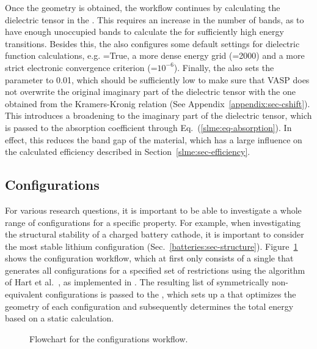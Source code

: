 \begin{refsection}
Once the geometry is obtained, the workflow continues by calculating the 
dielectric tensor in the . This requires an increase in the 
number of bands, as to have enough unoccupied bands to calculate the 
 for sufficiently high energy 
transitions. Besides this, the  also configures some default 
settings for dielectric function calculations, e.g. =True, a 
more dense energy grid (=2000) and a more strict electronic 
convergence criterion (=$10^{-6}$). Finally, the  
also sets the  parameter to 0.01, which should be sufficiently low to make sure 
that VASP does not overwrite the original imaginary part of the 
dielectric tensor with the one obtained from the Kramers-Kronig relation (See Appendix~\ref{appendix:sec-cshift}). This 
introduces a broadening to the imaginary part of the dielectric tensor, which 
is passed to the absorption coefficient through 
Eq.~(\ref{slme:eq-absorption}). In effect, this reduces the band gap of the 
material, which has a large influence on the calculated efficiency described 
in Section~\ref{slme:sec-efficiency}. 
 
\subsection{Configurations} \label{automation:sec-configurations} 
 
For various research questions, it is important to be able to investigate a 
whole range of configurations for a specific property. For example, when 
investigating the structural stability of a charged battery cathode, it is 
important to consider the most stable lithium 
configuration (Sec.~\ref{batteries:sec-structure}). 
Figure~\ref{automation:fig-configurations} shows the configuration workflow, 
which at first only consists of a single  that generates all 
configurations for a specified set of restrictions using the algorithm of Hart 
et al.~\cite{Hart2005}, as implemented in 
. The 
resulting list of symmetrically non-equivalent configurations is passed to the 
, which sets up a 
 that optimizes the geometry of each configuration and 
subsequently determines the total energy based on a static calculation. 
 
\begin{figure}[ht] 
\centering 
 
\caption{\label{automation:fig-configurations} Flowchart for the 
configurations workflow.} 
\end{figure} 
 

\end{refsection}
